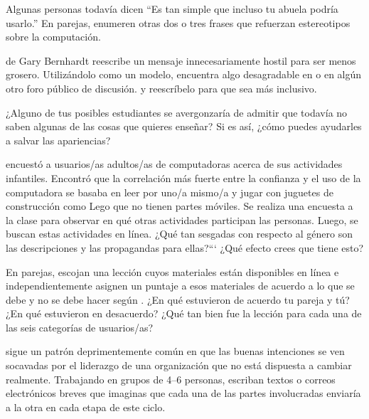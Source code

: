 
Algunas personas todavía dicen ``Es tan simple que incluso tu abuela podría usarlo.''
En parejas,
enumeren otras dos o tres frases que refuerzan estereotipos sobre la computación.


de Gary Bernhardt
reescribe un mensaje innecesariamente hostil para ser menos grosero.
Utilizándolo como un modelo,
encuentra algo desagradable en  o en algún otro foro público de discusión.
y reescríbelo para que sea más inclusivo.


¿Alguno de tus posibles estudiantes se avergonzaría de admitir que
todavía no saben algunas de las cosas que quieres enseñar?
Si es así,
¿cómo puedes ayudarles a salvar las apariencias?


\cite{Cutt2017} encuestó a usuarios/as adultos/as de computadoras acerca de sus actividades infantiles.
Encontró que la correlación más fuerte entre la confianza y el uso de la computadora
se basaba en leer por uno/a mismo/a y jugar con juguetes de construcción como Lego que no tienen partes móviles.
Se realiza una encuesta a la clase para observar en qué otras actividades participan las personas. Luego,
se buscan estas actividades en línea.
¿Qué tan sesgadas con respecto al género son las descripciones y las propagandas para ellas?```
¿Qué efecto crees que tiene esto?


En parejas,
escojan una lección cuyos materiales están disponibles en línea
e independientemente asignen un puntaje a esos materiales de acuerdo a lo que se debe y no se debe hacer según
.
¿En qué estuvieron de acuerdo tu pareja y tú?
¿En qué estuvieron en desacuerdo?
¿Qué tan bien fue la lección para cada una de las seis categorías de usuarios/as?


\cite{Coco2018} sigue un patrón deprimentemente común
en que las buenas intenciones se ven socavadas por
el liderazgo de una organización que no está dispuesta a cambiar realmente.
Trabajando en grupos de 4--6 personas,
escriban textos o correos electrónicos breves que imaginas que cada una de las partes involucradas enviaría a la otra
en cada etapa de este ciclo.

